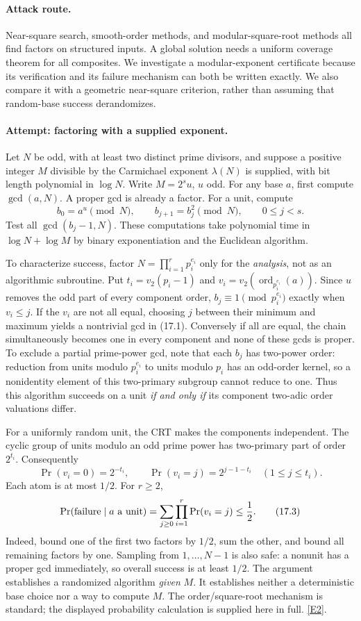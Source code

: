 \documentclass[11pt,a4paper]{article}
\newcommand{\eref}[2]{\hyperlink{extra:#1:#2}{[E#2]}}
\begin{document}
\paragraph{Attack route.}
Near-square search, smooth-order methods, and modular-square-root methods
all find factors on structured inputs. A global solution needs a uniform
coverage theorem for all composites. We investigate a modular-exponent
certificate because its verification and its failure mechanism can both
be written exactly. We also compare it with a geometric near-square
criterion, rather than assuming that random-base success derandomizes.

\paragraph{Attempt: factoring with a supplied exponent.}
Let $N$ be odd, with at least two distinct prime divisors, and suppose a
positive integer $M$ divisible by the Carmichael exponent $\lambda(N)$
is supplied, with bit length polynomial in $\log N$. Write $M=2^su$,
$u$ odd. For any base $a$, first compute $\gcd(a,N)$. A proper gcd is
already a factor. For a unit, compute
\[
 b_0=a^u\pmod N,\qquad b_{j+1}=b_j^2\pmod N,
 \qquad 0\leq j<s.
 \tag{17.1}
\]
Test all $\gcd(b_j-1,N)$. These computations take polynomial time in
$\log N+\log M$ by binary exponentiation and the Euclidean algorithm.

To characterize success, factor $N=\prod_{i=1}^r p_i^{e_i}$ only for the
\emph{analysis}, not as an algorithmic subroutine. Put
$t_i=v_2(p_i-1)$ and
$v_i=v_2(\operatorname{ord}_{p_i^{e_i}}(a))$. Since $u$ removes the odd
part of every component order, $b_j\equiv1\pmod{p_i^{e_i}}$ exactly when
$v_i\leq j$. If the $v_i$ are not all equal, choosing $j$ between their
minimum and maximum yields a nontrivial gcd in (17.1). Conversely if all
are equal, the chain simultaneously becomes one in every component and
none of these gcds is proper. To exclude a partial prime-power gcd,
note that each $b_j$ has two-power order: reduction from units modulo
$p_i^{e_i}$ to units modulo $p_i$ has an odd-order kernel, so a nonidentity
element of this two-primary subgroup cannot reduce to one. Thus this
algorithm succeeds on a unit
\emph{if and only if} its component two-adic order valuations differ.

For a uniformly random unit, the CRT makes the components independent.
The cyclic group of units modulo an odd prime power has two-primary
part of order $2^{t_i}$. Consequently
\[
 \Pr(v_i=0)=2^{-t_i},\qquad
 \Pr(v_i=j)=2^{j-1-t_i}\quad(1\leq j\leq t_i).
 \tag{17.2}
\]
Each atom is at most $1/2$. For $r\geq2$,
\[
 \Pr(\hbox{failure}\mid a\text{ a unit})
 =\sum_{j\geq0}\prod_{i=1}^r\Pr(v_i=j)\leq\frac12.
 \tag{17.3}
\]
Indeed, bound one of the first two factors by $1/2$, sum the other, and
bound all remaining factors by one. Sampling from $1,\ldots,N-1$ is also
safe: a nonunit has a proper gcd immediately, so overall success is at
least $1/2$. The argument establishes a randomized algorithm \emph{given}
$M$. It establishes neither a deterministic base choice nor a way to
compute $M$. The order/square-root mechanism is standard; the displayed
probability calculation is supplied here in full. \eref{statement}{2}.
\end{document}
